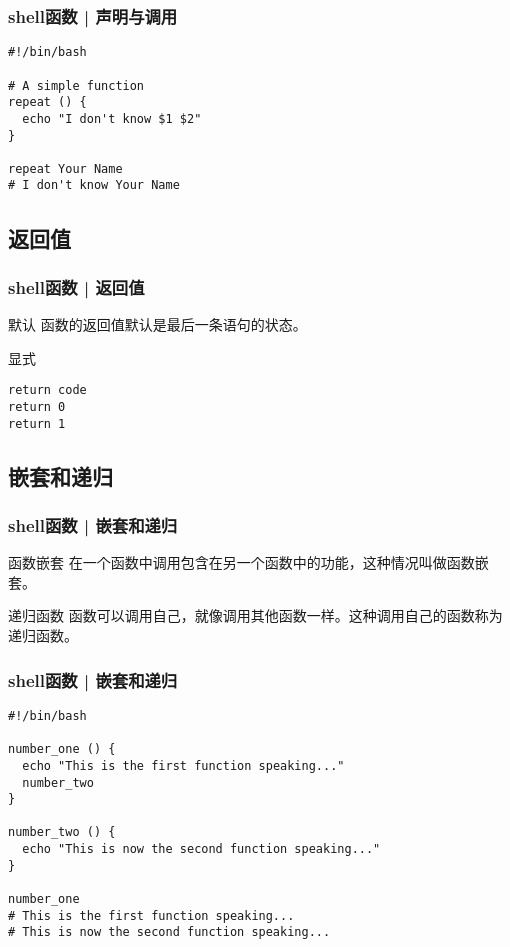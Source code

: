 \begin{frame}[fragile]
  \frametitle{shell函数 | 声明与调用}
\begin{lstlisting}
#!/bin/bash

# A simple function
repeat () {
  echo "I don't know $1 $2"
}

repeat Your Name
# I don't know Your Name
\end{lstlisting}
\end{frame}

\subsection{返回值}
\begin{frame}[fragile]
  \frametitle{shell函数 | \alert{返回值}}
  \begin{block}{默认}
    函数的返回值默认是最后一条语句的状态。
  \end{block}
  \pause
  \begin{block}{显式}
\begin{lstlisting}
return code
return 0
return 1
\end{lstlisting}
  \end{block}
\end{frame}

\subsection{嵌套和递归}
\begin{frame}[fragile]
  \frametitle{shell函数 | 嵌套和递归}
  \begin{block}{函数嵌套}
  在一个函数中调用包含在另一个函数中的功能，这种情况叫做函数嵌套。
  \end{block}
  \pause
  \begin{block}{递归函数}
  函数可以调用自己，就像调用其他函数一样。这种调用自己的函数称为递归函数。
  \end{block}
\end{frame}

\begin{frame}[fragile]
  \frametitle{shell函数 | 嵌套和递归}
  \vspace{-0.5em}
\begin{lstlisting}
#!/bin/bash

number_one () {
  echo "This is the first function speaking..."
  number_two
}

number_two () {
  echo "This is now the second function speaking..."
}

number_one
# This is the first function speaking...
# This is now the second function speaking...
\end{lstlisting}
\end{frame}

